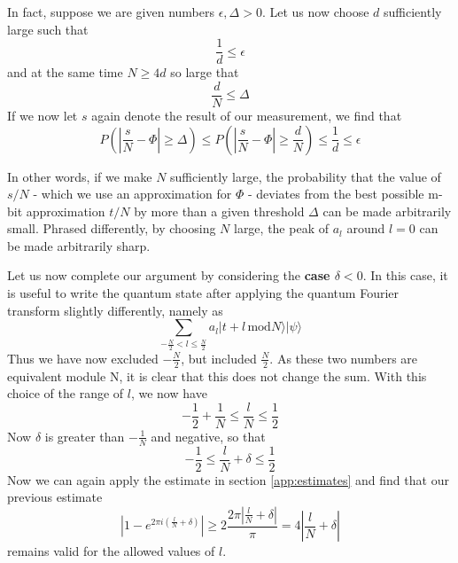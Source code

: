 \documentclass[a4paper, draft]{article}
\theoremstyle{own}
\theoremstyle{remark}
\begin{document}
In fact, suppose we are given numbers $\epsilon, \Delta > 0$. Let us now choose $d$ sufficiently large such that 
$$
\frac{1}{d} \leq \epsilon
$$
and at the same time $N \geq 4d$ so large that
$$
\frac{d}{N} \leq \Delta
$$
If we now let $s$ again denote the result of our measurement, we find that
$$
P (| \frac{s}{N} - \Phi | \geq \Delta)
\leq
P (| \frac{s}{N} - \Phi  | \geq \frac{d}{N})
 \leq \frac{1}{d} \leq \epsilon
$$

In other words, if we make $N$ sufficiently large, the probability that the value of $s / N$ - which we use an approximation for $\Phi$ - deviates from the best possible m-bit approximation $t / N$ by more than a given threshold $\Delta$ can be made arbitrarily small. Phrased differently, by choosing $N$ large, the peak of $a_l$ around $l = 0$ can be made arbitrarily sharp. 

Let us now complete our argument by considering the {\bf case $\delta < 0$}. In this case, it is useful to write the quantum state after applying the quantum Fourier transform slightly differently, namely as
$$
\sum_{- \frac{N}{2} < l \leq \frac{N}{2}} a_l | t + l \, \text{mod} N \rangle |\psi \rangle
$$
Thus we have now excluded $-\frac{N}{2}$, but included $\frac{N}{2}$. As these two numbers are equivalent module N, it is clear that this does not change the sum. With this choice of the range of $l$, we now have
$$
- \frac{1}{2}  + \frac{1}{N} \leq  \frac{l}{N} \leq \frac{1}{2}
$$
Now $\delta$ is greater than $-\frac{1}{N}$ and negative, so that
$$
- \frac{1}{2} \leq \frac{l}{N} + \delta \leq \frac{1}{2} 
$$
Now we can again apply the estimate in section \ref{app:estimates} and find that our previous estimate
$$
| 1 - e^{2\pi i (\frac{l}{N} + \delta) } | \geq 2 \frac{2\pi  |\frac{l}{N} + \delta|}{\pi} = 4 |\frac{l}{N} + \delta|
$$
remains valid for the allowed values of $l$. 
\end{document}
